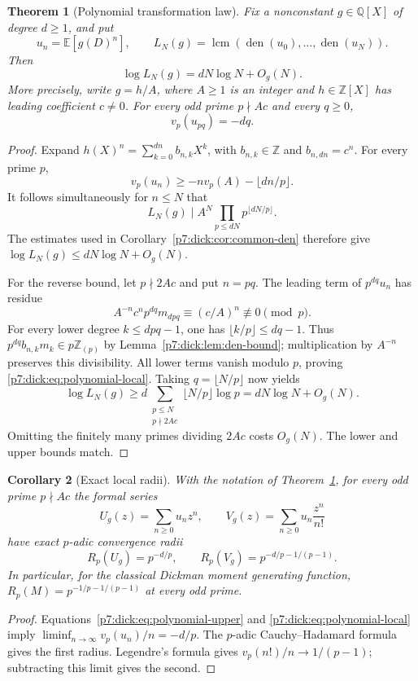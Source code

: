 \documentclass[11pt,a4paper]{article}
\newtheorem{theorem}{Theorem}[section]
\newtheorem{corollary}[theorem]{Corollary}
\theoremstyle{definition}
\theoremstyle{remark}
\newcommand{\Q}{\mathbb Q}
\newcommand{\Z}{\mathbb Z}
\DeclareMathOperator{\den}{den}
\DeclareMathOperator{\lcm}{lcm}
\numberwithin{equation}{section}
\begin{document}
\begin{theorem}[Polynomial transformation law]\label{p7:dick:thm:polynomial}
Fix a nonconstant $g\in\Q[X]$ of degree $d\ge1$, and put
\[
 u_n=\mathbb E[g(D)^n],\qquad
 L_N(g)=\lcm(\den(u_0),\ldots,\den(u_N)).
\]
Then
\begin{equation}\label{p7:dick:eq:polynomial-growth}
 \log L_N(g)=dN\log N+O_g(N).
\end{equation}
More precisely, write $g=h/A$, where $A\ge1$ is an integer and
$h\in\Z[X]$ has leading coefficient $c\ne0$.  For every odd prime
$p\nmid Ac$ and every $q\ge0$,
\begin{equation}\label{p7:dick:eq:polynomial-local}
 v_p(u_{pq})=-dq.
\end{equation}
\end{theorem}
\begin{proof}
Expand
$h(X)^n=\sum_{k=0}^{dn}b_{n,k}X^k$, with $b_{n,k}\in\Z$ and
$b_{n,dn}=c^n$.  For every prime $p$,
\begin{equation}\label{p7:dick:eq:polynomial-upper}
 v_p(u_n)\ge-nv_p(A)-\lfloor dn/p\rfloor.
\end{equation}
It follows simultaneously for $n\le N$ that
\[
 L_N(g)\mid A^N\prod_{p\le dN}p^{\lfloor dN/p\rfloor}.
\]
The estimates used in Corollary~\ref{p7:dick:cor:common-den} therefore give
$\log L_N(g)\le dN\log N+O_g(N)$.

For the reverse bound, let $p\nmid2Ac$ and put $n=pq$.  The leading term
of $p^{dq}u_n$ has residue
\[
 A^{-n}c^n p^{dq}m_{dpq}\equiv(c/A)^n\not\equiv0\pmod p.
\]
For every lower degree $k\le dpq-1$, one has
$\lfloor k/p\rfloor\le dq-1$.  Thus
$p^{dq}b_{n,k}m_k\in p\Z_{(p)}$ by
Lemma~\ref{p7:dick:lem:den-bound}; multiplication by $A^{-n}$ preserves
this divisibility.  All lower terms vanish modulo $p$, proving
\eqref{p7:dick:eq:polynomial-local}.
Taking $q=\lfloor N/p\rfloor$ now yields
\[
 \log L_N(g)\ge
 d\sum_{\substack{p\le N\\p\nmid2Ac}}\lfloor N/p\rfloor\log p
 =dN\log N+O_g(N).
\]
Omitting the finitely many primes dividing $2Ac$ costs $O_g(N)$.
The lower and upper bounds match.
\end{proof}

\begin{corollary}[Exact local radii]\label{p7:dick:cor:radii}
With the notation of Theorem~\ref{p7:dick:thm:polynomial}, for every odd
prime $p\nmid Ac$ the formal series
\[
 U_g(z)=\sum_{n\ge0}u_nz^n,
 \qquad V_g(z)=\sum_{n\ge0}u_n\frac{z^n}{n!}
\]
have exact $p$-adic convergence radii
\begin{equation}\label{p7:dick:eq:radii}
 R_p(U_g)=p^{-d/p},\qquad
 R_p(V_g)=p^{-d/p-1/(p-1)}.
\end{equation}
In particular, for the classical Dickman moment generating function,
$R_p(M)=p^{-1/p-1/(p-1)}$ at every odd prime.
\end{corollary}
\begin{proof}
Equations~\eqref{p7:dick:eq:polynomial-upper} and
\eqref{p7:dick:eq:polynomial-local} imply
$\liminf_{n\to\infty}v_p(u_n)/n=-d/p$.
The $p$-adic Cauchy--Hadamard formula gives the first radius.
Legendre's formula gives $v_p(n!)/n\to1/(p-1)$; subtracting this limit
gives the second.
\end{proof}
\end{document}
